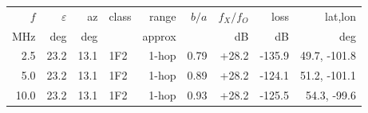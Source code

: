 \begin{tabular}{rrrlrrrrr}
\toprule
$f$ & $\varepsilon$ & az & class & range & $b/a$ & $f_X/f_O$ & loss & lat,lon \\
MHz & deg & deg & & approx & & dB & dB & deg \\
\midrule
2.5 & 23.2 & 13.1 & 1F2 & 1-hop & 0.79 & +28.2 & -135.9 & 49.7, -101.8 \\
5.0 & 23.2 & 13.1 & 1F2 & 1-hop & 0.89 & +28.2 & -124.1 & 51.2, -101.1 \\
10.0 & 23.2 & 13.1 & 1F2 & 1-hop & 0.93 & +28.2 & -125.5 & 54.3, -99.6 \\
\bottomrule
\end{tabular}
